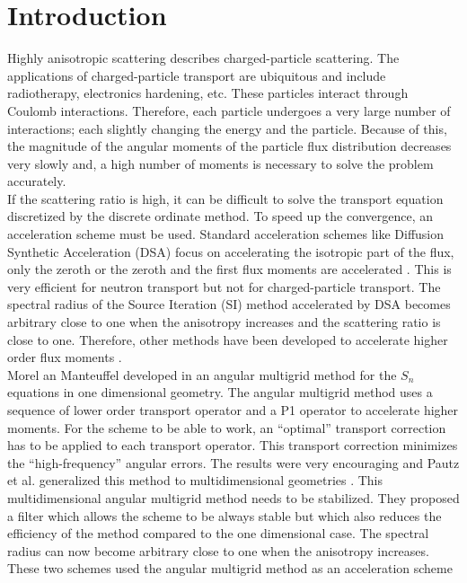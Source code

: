 \section{Introduction}
Highly anisotropic scattering describes charged-particle scattering. 
The applications of charged-particle transport are ubiquitous and include radiotherapy, 
electronics hardening, etc. These particles interact through Coulomb
interactions. Therefore, each particle undergoes a very large number of
interactions; each slightly changing the energy and the particle.
Because of this, the magnitude of the angular moments of the particle flux
distribution decreases very slowly and, a high number of moments is 
necessary to solve the problem accurately.\\
If the scattering ratio is high, it can be difficult to solve the transport
equation discretized by the discrete ordinate method. To speed up the
convergence, an acceleration scheme must be used. Standard acceleration schemes 
like Diffusion Synthetic Acceleration (DSA) focus on accelerating the isotropic 
part of the flux, only the zeroth or the zeroth and the first flux 
moments are accelerated \cite{adams}. This is very efficient for neutron transport 
but not for charged-particle transport. The spectral radius of the Source
Iteration (SI) method accelerated by DSA becomes arbitrary close to one when the 
anisotropy increases and the scattering ratio is close to one. Therefore, other methods have been 
developed to accelerate higher order flux moments 
\cite{kassem,multigrid_1d,multigrid_2d}.\\
Morel an Manteuffel developed in \cite{multigrid_1d} an angular multigrid
method for the $S_n$ equations in one dimensional geometry. The angular
multigrid method uses a sequence of lower order transport operator and a
P1 operator to accelerate higher moments. For the scheme to be able to
work, an ``optimal'' transport correction has to be applied to each transport
operator. This transport correction minimizes the ``high-frequency'' angular
errors. The results were very encouraging and Pautz et al. generalized this method 
to multidimensional geometries \cite{multigrid_2d}. This multidimensional
angular multigrid method needs to be stabilized. They proposed a 
filter which allows the scheme to be always stable but which also reduces the 
efficiency of the method compared to the one dimensional case. The spectral 
radius can now become arbitrary close to one when the anisotropy increases.
These two schemes used the angular multigrid method as an acceleration scheme
